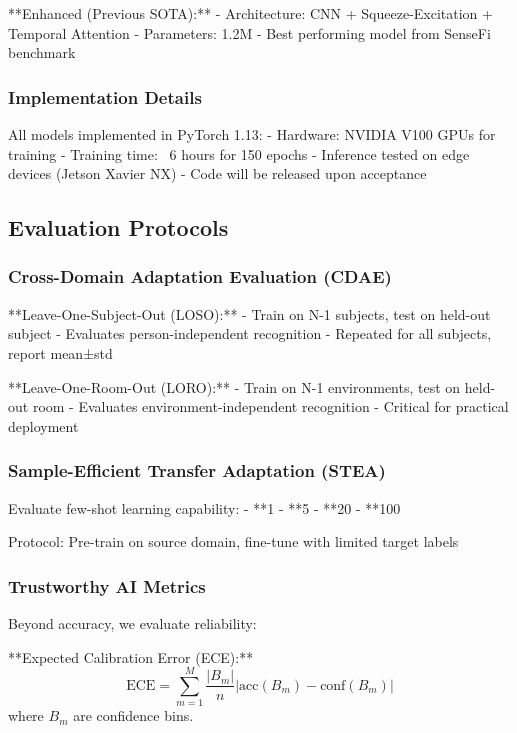 \documentclass[10pt,journal,compsoc]{IEEEtran}
\begin{document}
**Enhanced (Previous SOTA):**
- Architecture: CNN + Squeeze-Excitation + Temporal Attention
- Parameters: 1.2M
- Best performing model from SenseFi benchmark

\subsubsection{Implementation Details}

All models implemented in PyTorch 1.13:
- Hardware: NVIDIA V100 GPUs for training
- Training time: ~6 hours for 150 epochs
- Inference tested on edge devices (Jetson Xavier NX)
- Code will be released upon acceptance

\subsection{Evaluation Protocols}

\subsubsection{Cross-Domain Adaptation Evaluation (CDAE)}

**Leave-One-Subject-Out (LOSO):**
- Train on N-1 subjects, test on held-out subject
- Evaluates person-independent recognition
- Repeated for all subjects, report mean±std

**Leave-One-Room-Out (LORO):**
- Train on N-1 environments, test on held-out room
- Evaluates environment-independent recognition
- Critical for practical deployment

\subsubsection{Sample-Efficient Transfer Adaptation (STEA)}

Evaluate few-shot learning capability:
- **1%
- **5%
- **20%
- **100%

Protocol: Pre-train on source domain, fine-tune with limited target labels

\subsubsection{Trustworthy AI Metrics}

Beyond accuracy, we evaluate reliability:

**Expected Calibration Error (ECE):**
\begin{equation}
\text{ECE} = \sum_{m=1}^{M} \frac{|B_m|}{n} |\text{acc}(B_m) - \text{conf}(B_m)|
\end{equation}
where $B_m$ are confidence bins.
\end{document}
